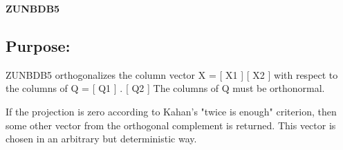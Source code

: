 {\bfseries Z\+U\+N\+B\+D\+B5} 

\subsection*{Purpose\+: }

\begin{DoxyVerb} ZUNBDB5 orthogonalizes the column vector
      X = [ X1 ]
          [ X2 ]
 with respect to the columns of
      Q = [ Q1 ] .
          [ Q2 ]
 The columns of Q must be orthonormal.

 If the projection is zero according to Kahan's "twice is enough"
 criterion, then some other vector from the orthogonal complement
 is returned. This vector is chosen in an arbitrary but deterministic
 way.\end{DoxyVerb}
 
